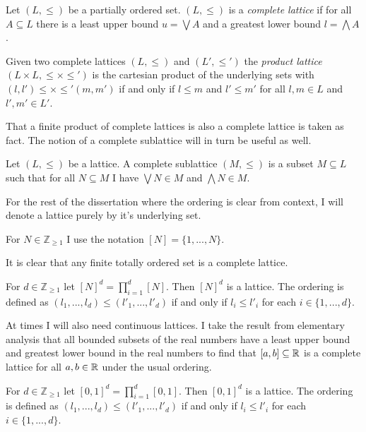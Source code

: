 \begin{definition}
  Let $(L, \leq)$ be a partially ordered set. $(L, \leq)$ is a \emph{complete lattice} if for all
  $A \subseteq L$ there is a least upper bound $u = \bigvee A$ and a greatest lower bound $l = \bigwedge A$.
\end{definition}
\begin{definition}
  Given two complete lattices $(L, \leq)$ and $(L', \leq')$ the \emph{product lattice} $(L \times L, \leq \times \leq')$
  is the cartesian product of the underlying sets with $(l, l') \leq \times \leq' (m, m')$ if and only if
  $l \leq m$ and $l' \leq m'$ for all $l, m \in L$ and $l', m' \in L'$.
\end{definition}
That a finite product of complete lattices is also a complete lattice is taken as fact.
The notion of a complete sublattice will in turn be useful as well.
\begin{definition}[Sublattice]
  Let $(L, \leq)$ be a lattice. A complete sublattice $(M, \leq)$ is a
  subset $M \subseteq L$ such that for all $N \subseteq M$ I have $\bigvee N \in M$
  and $\bigwedge N \in M$.
\end{definition}
For the rest of the dissertation where the ordering is clear from context, I will denote a lattice purely by
it's underlying set.
\begin{notation}
  For $N \in \mathbb{Z}_{\geq 1}$ I use the notation $[N] = \{1, ..., N\}$.
\end{notation}
It is clear that any finite totally ordered set is a complete lattice.
\begin{cor}
  For $d \in \mathbb{Z}_{\geq 1}$ let $[N]^d = \prod_{i=1}^d [N]$. Then $[N]^d$ is a lattice. 
  The ordering is defined as $(l_1, ..., l_d) \leq (l'_1, ..., l'_d)$
  if and only if $l_i \leq l'_i$ for each $i \in \{1, ..., d\}$.
\end{cor}
At times I will also need continuous lattices. I take the result from elementary analysis
that all bounded subsets of the real numbers have a least upper bound and greatest lower bound
in the real numbers to find that $[a, b] \subseteq \mathbb{R}$ is a complete lattice for all $a, b \in \mathbb{R}$
under the usual ordering.
\begin{cor}
  For $d \in \mathbb{Z}_{\geq 1}$ let $[0, 1]^d = \prod_{i=1}^d [0, 1]$. Then $[0, 1]^d$ is a lattice. 
  The ordering is defined as $(l_1, ..., l_d) \leq (l'_1, ..., l'_d)$
  if and only if $l_i \leq l'_i$ for each $i \in \{1, ..., d\}$.
\end{cor}
